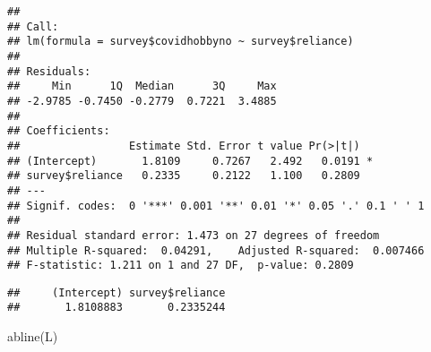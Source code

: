 \documentclass[
]{article}
\newenvironment{Shaded}{\begin{snugshade}}{\end{snugshade}}
\newcommand{\AttributeTok}[1]{\textcolor[rgb]{0.77,0.63,0.00}{#1}}
\newcommand{\CommentTok}[1]{\textcolor[rgb]{0.56,0.35,0.01}{\textit{#1}}}
\newcommand{\FunctionTok}[1]{\textcolor[rgb]{0.00,0.00,0.00}{#1}}
\newcommand{\NormalTok}[1]{#1}
\newcommand{\OtherTok}[1]{\textcolor[rgb]{0.56,0.35,0.01}{#1}}
\newcommand{\SpecialCharTok}[1]{\textcolor[rgb]{0.00,0.00,0.00}{#1}}
\newcommand{\StringTok}[1]{\textcolor[rgb]{0.31,0.60,0.02}{#1}}
\begin{document}
\begin{Shaded}
\end{Shaded}

\begin{verbatim}
## 
## Call:
## lm(formula = survey$covidhobbyno ~ survey$reliance)
## 
## Residuals:
##     Min      1Q  Median      3Q     Max 
## -2.9785 -0.7450 -0.2779  0.7221  3.4885 
## 
## Coefficients:
##                 Estimate Std. Error t value Pr(>|t|)  
## (Intercept)       1.8109     0.7267   2.492   0.0191 *
## survey$reliance   0.2335     0.2122   1.100   0.2809  
## ---
## Signif. codes:  0 '***' 0.001 '**' 0.01 '*' 0.05 '.' 0.1 ' ' 1
## 
## Residual standard error: 1.473 on 27 degrees of freedom
## Multiple R-squared:  0.04291,    Adjusted R-squared:  0.007466 
## F-statistic: 1.211 on 1 and 27 DF,  p-value: 0.2809
\end{verbatim}

\begin{Shaded}
\end{Shaded}

\begin{verbatim}
##     (Intercept) survey$reliance 
##       1.8108883       0.2335244
\end{verbatim}

\begin{Shaded}
\begin{Highlighting}[]
\FunctionTok{abline}\NormalTok{(L)}
\end{Highlighting}
\end{Shaded}
\end{document}
